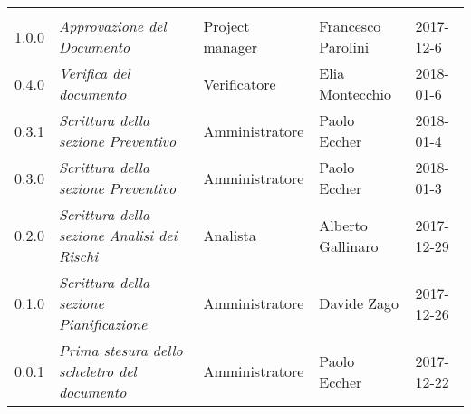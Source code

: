 \newpage 
\section*{}
\begin{table}[H]
	\centering
	\begin{tabular}{p{4cm}|C{3cm}|C{3cm}|R{2.5cm}|R{2cm}}
		
		 & & & &  \\
		
		
		1.0.0 &\emph{Approvazione del Documento} & Project manager & Francesco Parolini & 2017-12-6 \\
		\hline
		
		0.4.0 &\emph{Verifica del documento} & Verificatore & Elia Montecchio & 2018-01-6 \\
		\hline
		
		0.3.1 &\emph{Scrittura della sezione Preventivo} & Amministratore & Paolo Eccher  & 2018-01-4 \\
		\hline
		
		0.3.0 &\emph{Scrittura della sezione Preventivo} & Amministratore & Paolo Eccher & 2018-01-3 \\
		\hline
		
		0.2.0 &\emph{Scrittura della sezione Analisi dei Rischi} & Analista & Alberto Gallinaro & 2017-12-29 \\
		\hline
		
		0.1.0 &\emph{Scrittura della sezione Pianificazione} & Amministratore & Davide Zago & 2017-12-26 \\
		\hline
		
		0.0.1 &\emph{Prima stesura dello scheletro del documento} & Amministratore & Paolo Eccher & 2017-12-22 \\
		
	\end{tabular}
	
\end{table}


\clearpage